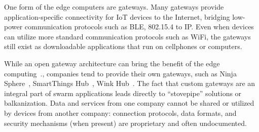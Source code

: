 One form of the edge computers are gateways. Many gateways provide
application-specific connectivity for IoT devices to the Internet, bridging
low-power communication protocols such as BLE, 802.15.4 to IP. Even when devices
can utilize more standard communication protocols such as WiFi, the gateways
still exist as downloadable applications that run on cellphones or computers.

While an open gateway architecture can bring the benefit of the edge
computing~\cite{zachariah1001internet}., companies tend to provide their own
gateways, such as Ninja Sphere~\cite{ninja}, SmartThings Hub~\cite{smartthings},
Wink Hub~\cite{wink}. The fact that custom gateways are an integral part of
swarm applications leads directly to ``stovepipe'' solutions or
balkanization. Data and services from one company cannot be shared or utilized
by devices from another company: connection protocols, data formats, and
security mechanisms (when present) are proprietary and often undocumented.


